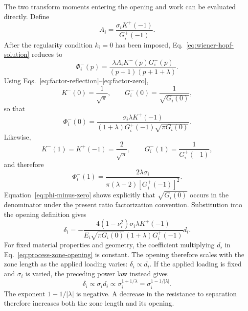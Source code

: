 \documentclass[pdflatex,onecolumn,sn-mathphys-ay]{sn-jnl}
\begin{document}
The two transform moments entering the opening and work can be evaluated
directly. Define
\begin{equation*}
  A_i=\frac{\sigma_iK^+(-1)}{G_i^+(-1)}.
\end{equation*}
After the regularity condition $k_i=0$ has been imposed,
Eq.~\eqref{eq:wiener-hopf-solution} reduces to
\begin{equation}
\label{eq:phi-minus-regular}
  \Phi_i^-(p)=
  \frac{\lambda A_i K^-(p)G_i^-(p)}
  {(p+1)(p+1+\lambda)}.
\end{equation}
Using Eqs.~\eqref{eq:factor-reflection}--\eqref{eq:factor-zero},
\begin{equation*}
  K^-(0)=\frac{1}{\sqrt{\pi}},\qquad
  G_i^-(0)=\frac{1}{\sqrt{G_i(0)}},
\end{equation*}
so that
\begin{equation}
\label{eq:phi-minus-zero}
  \Phi_i^-(0)=
  \frac{\sigma_i\lambda K^+(-1)}
  {(1+\lambda)G_i^+(-1)\sqrt{\pi G_i(0)}}.
\end{equation}
Likewise,
\begin{equation*}
  K^-(1)=K^+(-1)=\frac{2}{\sqrt{\pi}},\qquad
  G_i^-(1)=\frac{1}{G_i^+(-1)},
\end{equation*}
and therefore
\begin{equation}
\label{eq:phi-minus-one}
  \Phi_i^-(1)=
  \frac{2\lambda\sigma_i}
  {\pi(\lambda+2)[G_i^+(-1)]^2}.
\end{equation}
Equation~\eqref{eq:phi-minus-zero} shows explicitly that
$\sqrt{G_i(0)}$ occurs in the denominator under the present ratio
factorization convention. Substitution into the opening definition gives
\begin{equation}
\label{eq:process-zone-opening}
  \delta_i=
  -\frac{4(1-\nu_i^2)\sigma_i\lambda K^+(-1)}
  {E_i\sqrt{\pi G_i(0)}(1+\lambda)G_i^+(-1)}d_i.
\end{equation}
For fixed material properties and geometry, the coefficient multiplying
$d_i$ in Eq.~\eqref{eq:process-zone-opening} is constant. The opening
therefore scales with the zone length as the applied loading varies:
$\delta_i\propto d_i$. If the applied loading is fixed and $\sigma_i$
is varied, the preceding power law instead gives
\begin{equation*}
  \delta_i\propto \sigma_i d_i
  \propto \sigma_i^{1+1/\lambda}
  =\sigma_i^{1-1/|\lambda|}.
\end{equation*}
The exponent $1-1/|\lambda|$ is negative. A decrease in the resistance
to separation therefore increases both the zone length and its opening.
\end{document}
